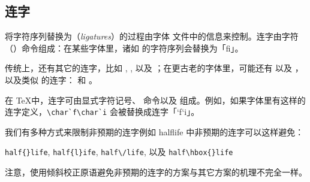 \documentclass{book}
\begin{document}
\subsection{连字}

将字符序列替换为（\emph{ligatures}）的过程由字体  文件中的信息来控制。连字由字符（）命令组成：在某些字体里，诸如  的字符序列会替换为「fi」。

传统上，还有其它的连字，比如 , ,  以及 ；在更古老的字体里，可能还有  以及 ，以及类似  的连字： 和 。

在 \TeX 中，连字可由显式字符记号、 命令以及  组成。例如，如果字体里有这样的连字定义，\verb-\char`f\char`i- 会被替换成连字「\char`f\char`i」。

我们有多种方式来限制非预期的连字例如 \hbox{halflife} 中非预期的连字可以这样避免：
\begin{disp}
\verb>half{}life>, \verb>half{l}ife>, \verb>half\/life>, 以及 \verb>half\hbox{}life>\end{disp}
注意，使用倾斜校正原语避免非预期的连字的方案与其它方案的机理不完全一样。

\end{document}
